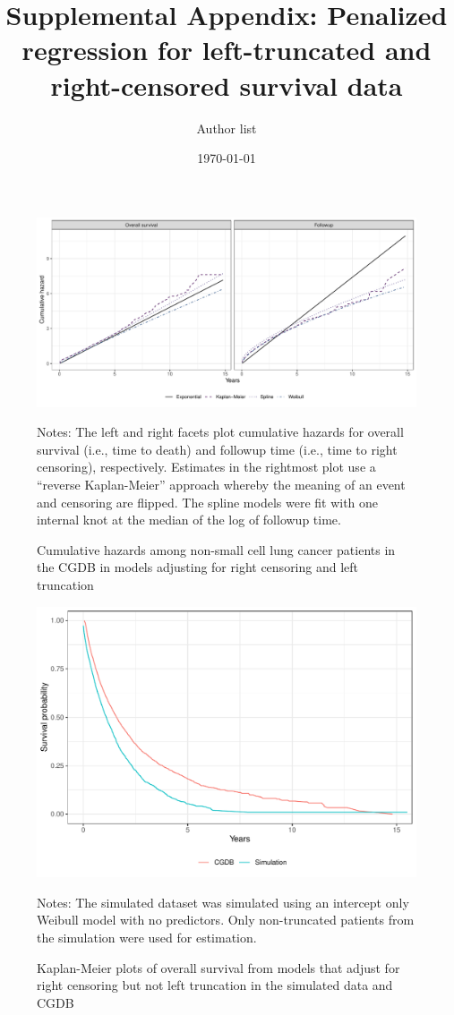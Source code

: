 \documentclass[11pt,final,fleqn]{article}
\title{Supplemental Appendix: Penalized regression for left-truncated and right-censored survival data}
\author{Author list}
\date{\today}
\begin{document}
\maketitle

\begin{figure}[h]
\centering
\includegraphics[max size={\textwidth}]{figs/sim_calibration_cumhaz.pdf} 
\caption{Cumulative hazards among non-small cell lung cancer patients in the CGDB in models adjusting for right censoring and left truncation}
\begin{minipage}{\linewidth}
\footnotesize
Notes: The left and right facets plot cumulative hazards for overall survival (i.e., time to death) and followup time (i.e., time to right censoring), respectively. Estimates in the rightmost plot use a ``reverse Kaplan-Meier'' approach whereby the meaning of an event and censoring are flipped. The spline models were fit with one internal knot at the median of the log of followup time. 
\end{minipage}
\end{figure}

\begin{figure}[h]
\centering
\includegraphics[max size={\textwidth}]{figs/sim_int_km_plot_rwd_v_sim.pdf} 
\caption{Kaplan-Meier plots of overall survival from models that adjust for right censoring but not left truncation in the simulated data and CGDB}
\begin{minipage}{\linewidth}
\footnotesize
Notes: The simulated dataset was simulated using an intercept only Weibull model with no predictors. Only non-truncated patients from the simulation were used for estimation. 
\end{minipage}
\end{figure}
\end{document}
